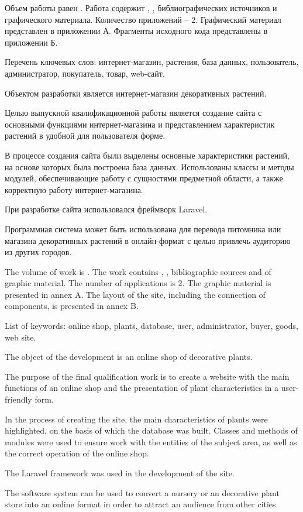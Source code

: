 
Объем работы равен . Работа содержит , ,  библиографических источников и  графического материала. Количество приложений – 2. Графический материал представлен в приложении А. Фрагменты исходного кода представлены в приложении Б.

Перечень ключевых слов: интернет-магазин, растения, база данных, пользователь, администратор, покупатель, товар, web-сайт.

Объектом разработки является интернет-магазин декоративных растений.

Целью выпускной квалификационной работы является создание сайта с основными функциями интернет-магазина и представлением характеристик растений в удобной для пользователя форме.

В процессе создания сайта были выделены основные характеристики растений, на основе которых была построена база данных. Использованы классы и методы модулей, обеспечивающие работу с сущностями предметной области, а также корректную работу интернет-магазина.

При разработке сайта использовался фреймворк Laravel.

Программная система может быть использована для перевода питомника или магазина декоративных растений в онлайн-формат с целью привлечь аудиторию из других городов.

  
The volume of work is . The work contains , ,  bibliographic sources and  of graphic material. The number of applications is 2. The graphic material is presented in annex A. The layout of the site, including the connection of components, is presented in annex B.

List of keywords: online shop, plants, database, user, administrator, buyer, goods, web site.

The object of the development is an online shop of decorative plants.

The purpose of the final qualification work is to create a website with the main functions of an online shop and the presentation of plant characteristics in a user-friendly form.

In the process of creating the site, the main characteristics of plants were highlighted, on the basis of which the database was built. Classes and methods of modules were used to ensure work with the entities of the subject area, as well as the correct operation of the online shop.

The Laravel framework was used in the development of the site.

The software system can be used to convert a nursery or an decorative plant store into an online format in order to attract an audience from other cities.
